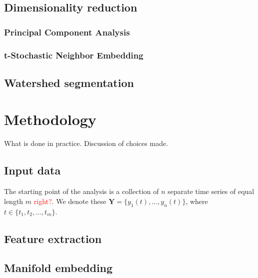 \documentclass{article}
\theoremstyle{plain}
\theoremstyle{definition}
\theoremstyle{remark}
\begin{document}
\subsection{Dimensionality reduction}
\subsubsection{Principal Component Analysis}
\subsubsection{t-Stochastic Neighbor Embedding}

\subsection{Watershed segmentation}

\section{Methodology}
What is done in practice.
Discussion  of choices made.
\subsection{Input data}
The starting point of the analysis is a collection of $n$ separate time series of equal length $m$ \textcolor{red}{right?}.
We denote these $\textbf{Y} = \{ y_1(t), \hdots, y_n(t) \}$, where $t \in \{ t_1, t_2, \hdots, t_m \}$.
\subsection{Feature extraction}
\subsection{Manifold embedding}








\newpage
\printbibliography
\end{document}
